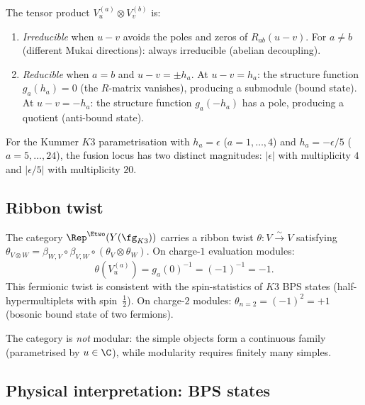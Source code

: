 The tensor product $V_u^{(a)} \otimes V_v^{(b)}$ is:
\begin{enumerate}[label=(\alph*)]
 \item \emph{Irreducible} when $u - v$ avoids the poles and zeros
 of $R_{ab}(u - v)$. For $a \neq b$ (different Mukai directions):
 always irreducible (abelian decoupling).
 \item \emph{Reducible} when $a = b$ and $u - v = \pm h_a$.
 At $u - v = h_a$: the structure function $g_a(h_a) = 0$ (the $R$-matrix
 vanishes), producing a submodule (bound state).
 At $u - v = -h_a$: the structure function $g_a(-h_a)$ has a pole,
 producing a quotient (anti-bound state).
\end{enumerate}
For the Kummer $K3$ parametrisation with $h_a = \epsilon$ ($a = 1, \dots, 4$)
and $h_a = -\epsilon/5$ ($a = 5, \dots, 24$), the fusion locus has two
distinct magnitudes: $|\epsilon|$ with multiplicity $4$ and $|\epsilon/5|$
with multiplicity $20$.

\subsection{Ribbon twist}
\label{subsec:chiral-qg-ribbon}

\begin{conjecture}
\label{conj:chiral-qg-ribbon}
\ClaimStatusConjectured
The category $\Rep^{\Etwo}(Y(\fg_{K3}))$ carries a ribbon twist
$\theta \colon V \xrightarrow{\sim} V$ satisfying
$\theta_{V \otimes W} = \beta_{W,V} \circ \beta_{V,W}
\circ (\theta_V \otimes \theta_W)$.
On charge-$1$ evaluation modules:
\[
 \theta(V_u^{(a)}) = g_a(0)^{-1} = (-1)^{-1} = -1.
\]
This fermionic twist is consistent with the spin-statistics of $K3$
BPS states (half-hypermultiplets with spin~$\tfrac{1}{2}$).
On charge-$2$ modules:
$\theta_{n=2} = (-1)^2 = +1$ (bosonic bound state of two fermions).

The category is \emph{not} modular: the simple objects form a
continuous family (parametrised by $u \in \C$), while modularity
requires finitely many simples.
\end{conjecture}

\subsection{Physical interpretation: BPS states}
\label{subsec:chiral-qg-bps}

